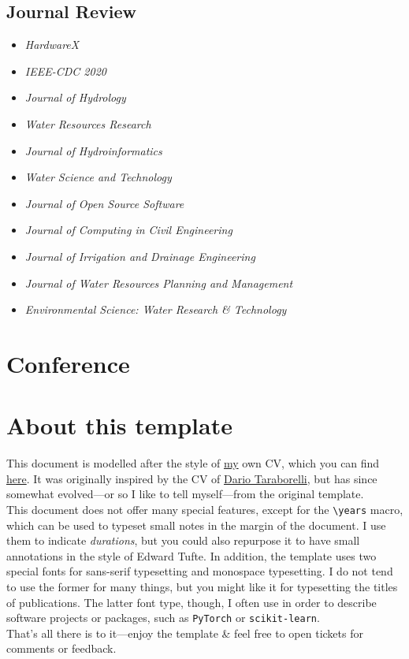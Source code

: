 \documentclass[a4paper,11pt]{article}
\newcommand{\years}[1]{%
  {\reversemarginpar\strut\marginnote{{\small#1}}}%
}
\begin{document}
\subsection*{Journal Review}
\begin{itemize}
	\item \textit{HardwareX}
	\item \textit{IEEE-CDC 2020}
	\item \textit{Journal of Hydrology}
	\item \textit{Water Resources Research}
	\item \textit{Journal of Hydroinformatics}
	\item \textit{Water Science and Technology}
	\item \textit{Journal of Open Source Software}
	\item \textit{Journal of Computing in Civil Engineering}
	\item \textit{Journal of Irrigation and Drainage Engineering}
	\item \textit{Journal of Water Resources Planning and Management}
	\item \textit{Environmental Science: Water Research \& Technology}
\end{itemize}

\section*{Conference}


\section*{About this template}

This document is modelled after the style of
\href{https://bastian.rieck.me}{my} own CV, which you can find
\href{https://bastian.rieck.me/about/cv.pdf}{here}. It was originally
inspired by the CV of \href{http://nitens.org/taraborelli/cvtex}{Dario
Taraborelli}, but has since somewhat evolved---or so I like to tell
myself---from the original template.\\

This document does not offer many special features, except for the
\verb|\years| macro, which can be used to typeset small notes in the
margin of the document. I use them to indicate \emph{durations}, but you
could also repurpose it to have small annotations in the style of Edward
Tufte. In addition, the template uses two special fonts for sans-serif
typesetting and monospace typesetting. I do not tend to use the former
for many things, but you might like it for typesetting the titles of
publications. The latter font type, though, I often use in order to
describe software projects or packages, such as \texttt{PyTorch} or
\texttt{scikit-learn}.\\

That's all there is to it---enjoy the template \& feel free to open
tickets for comments or feedback.
\end{document}
